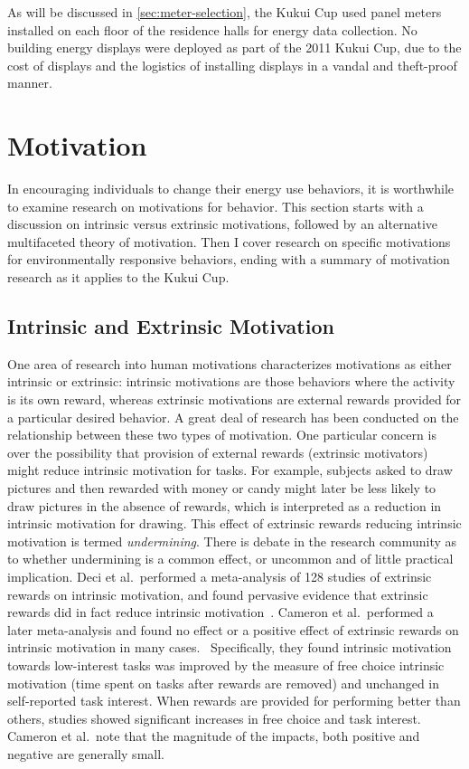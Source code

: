 As will be discussed in \autoref{sec:meter-selection}, the Kukui Cup used panel meters installed on each floor of the residence halls for energy data collection. No building energy displays were deployed as part of the 2011 Kukui Cup, due to the cost of displays and the logistics of installing displays in a vandal and theft-proof manner.


\section{Motivation}

In encouraging individuals to change their energy use behaviors, it is worthwhile to examine research on motivations for behavior. This section starts with a discussion on intrinsic versus extrinsic motivations, followed by an alternative multifaceted theory of motivation. Then I cover research on specific motivations for environmentally responsive behaviors, ending with a summary of motivation research as it applies to the Kukui Cup.


\subsection{Intrinsic and Extrinsic Motivation}

One area of research into human motivations characterizes motivations as either intrinsic or extrinsic: intrinsic motivations are those behaviors where the activity is its own reward, whereas extrinsic motivations are external rewards provided for a particular desired behavior. A great deal of research has been conducted on the relationship between these two types of motivation. One particular concern is over the possibility that provision of external rewards (extrinsic motivators) might reduce intrinsic motivation for tasks. For example, subjects asked to draw pictures and then rewarded with money or candy might later be less likely to draw pictures in the absence of rewards, which is interpreted as a reduction in intrinsic motivation for drawing. This effect of extrinsic rewards reducing intrinsic motivation is termed \emph{undermining}. There is debate in the research community as to whether undermining is a common effect, or uncommon and of little practical implication. Deci et al.\ performed a meta-analysis of 128 studies of extrinsic rewards on intrinsic motivation, and found pervasive evidence that extrinsic rewards did in fact reduce intrinsic motivation~\cite{Deci1999}. Cameron et al.\ performed a later meta-analysis and found no effect or a positive effect of extrinsic rewards on intrinsic motivation in many cases.~\cite{Cameron2001} Specifically, they found intrinsic motivation towards low-interest tasks was improved by the measure of free choice intrinsic motivation (time spent on tasks after rewards are removed) and unchanged in self-reported task interest. When rewards are provided for performing better than others, studies showed significant increases in free choice and task interest. Cameron et al.\ note that the magnitude of the impacts, both positive and negative are generally small.


